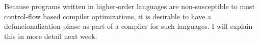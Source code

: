Because programs written in higher-order languages are non-susceptible
to most control-flow based compiler optimizations,
it is desirable to have a defuncionalization-phase as part of a compiler
for such languages.
I will explain this in more detail next week.
